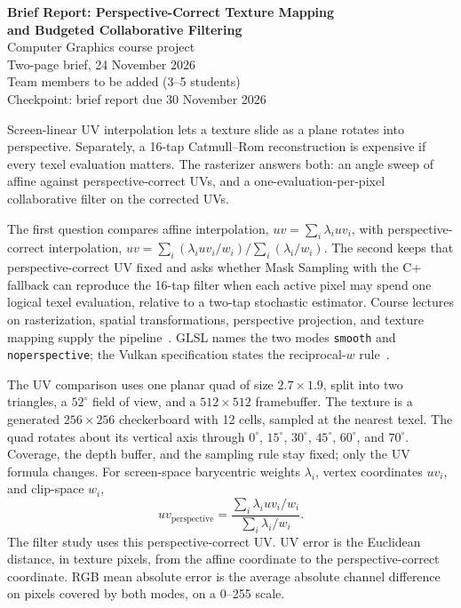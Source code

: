 \documentclass[a4paper,11pt]{article}
\makeatletter
\renewcommand\section{\@startsection{section}{1}{\z@}{0.72em}{0.22em}{\normalsize\bfseries}}
\makeatother
\begin{document}
\begin{center}
{\Large\bfseries Brief Report: Perspective-Correct Texture Mapping\\
and Budgeted Collaborative Filtering}\\[0.45em]
{\normalsize Computer Graphics course project}\\[0.2em]
{\small Two-page brief, 24 November 2026}\\[0.25em]
{\small Team members to be added \quad (3--5 students)}\\[0.12em]
{\small Checkpoint: brief report due 30 November 2026}
\end{center}

\section{Question}
Screen-linear UV interpolation lets a texture slide as a plane rotates into perspective. Separately, a 16-tap Catmull--Rom reconstruction is expensive if every texel evaluation matters. The rasterizer answers both: an angle sweep of affine against perspective-correct UVs, and a one-evaluation-per-pixel collaborative filter on the corrected UVs.

The first question compares affine interpolation, $uv=\sum_i\lambda_i uv_i$, with perspective-correct interpolation, $uv=\sum_i(\lambda_i uv_i/w_i)/\sum_i(\lambda_i/w_i)$. The second keeps that perspective-correct UV fixed and asks whether Mask Sampling with the C+ fallback can reproduce the 16-tap filter when each active pixel may spend one logical texel evaluation, relative to a two-tap stochastic estimator. Course lectures on rasterization, spatial transformations, perspective projection, and texture mapping supply the pipeline~\cite{course3,course4,course5,course6}. GLSL names the two modes \texttt{smooth} and \texttt{noperspective}; the Vulkan specification states the reciprocal-$w$ rule~\cite{glsl,vulkan}.

\section{Method}
The UV comparison uses one planar quad of size $2.7\times 1.9$, split into two triangles, a $52^\circ$ field of view, and a $512\times 512$ framebuffer. The texture is a generated $256\times 256$ checkerboard with 12 cells, sampled at the nearest texel. The quad rotates about its vertical axis through $0^\circ$, $15^\circ$, $30^\circ$, $45^\circ$, $60^\circ$, and $70^\circ$. Coverage, the depth buffer, and the sampling rule stay fixed; only the UV formula changes. For screen-space barycentric weights $\lambda_i$, vertex coordinates $uv_i$, and clip-space $w_i$,
\begin{equation*}
uv_{\mathrm{perspective}}
=\frac{\sum_i\lambda_i uv_i/w_i}{\sum_i\lambda_i/w_i}.
\end{equation*}
The filter study uses this perspective-correct UV. UV error is the Euclidean distance, in texture pixels, from the affine coordinate to the perspective-correct coordinate. RGB mean absolute error is the average absolute channel difference on pixels covered by both modes, on a 0--255 scale.
\end{document}
